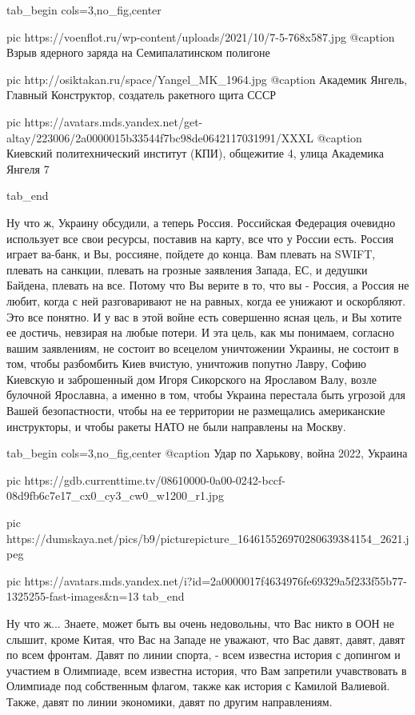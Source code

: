 \ifcmt
  tab_begin cols=3,no_fig,center

		 pic https://voenflot.ru/wp-content/uploads/2021/10/7-5-768x587.jpg
		 @caption Взрыв ядерного заряда на Семипалатинском полигоне

		 pic http://osiktakan.ru/space/Yangel_MK_1964.jpg
		 @caption Академик Янгель, Главный Конструктор, создатель ракетного щита СССР

		 pic https://avatars.mds.yandex.net/get-altay/223006/2a0000015b33544f7bc98de0642117031991/XXXL
		 @caption Киевский политехнический институт (КПИ), общежитие 4, улица Академика Янгеля 7

  tab_end
\fi

Ну что ж, Украину обсудили, а теперь Россия. Российская Федерация очевидно
использует все свои ресурсы, поставив на карту, все что у России есть. Россия
играет ва-банк, и Вы, россияне, пойдете до конца. Вам плевать на SWIFT, плевать
на санкции, плевать на грозные заявления Запада, ЕС, и дедушки Байдена, плевать
на все. Потому что Вы верите в то, что вы - Россия, а Россия не любит, когда с
ней разговаривают не на равных, когда ее унижают и оскорбляют. Это все понятно.
И у вас в этой войне есть совершенно ясная цель, и Вы хотите ее достичь,
невзирая на любые потери. И эта цель, как мы понимаем, согласно вашим
заявлениям, не состоит во всецелом уничтожении Украины, не состоит в том, чтобы
разбомбить Киев вчистую, уничтожив попутно Лавру, Софию Киевскую и заброшенный
дом Игоря Сикорского на Ярославом Валу, возле булочной Ярославна, а именно в
том, чтобы Украина перестала быть угрозой для Вашей безопастности, чтобы на ее
территории не размещались американские инструкторы, и чтобы ракеты НАТО не были
направлены на Москву.

\ifcmt
  tab_begin cols=3,no_fig,center
		 @caption Удар по Харькову, война 2022, Украина

     pic https://gdb.currenttime.tv/08610000-0a00-0242-bccf-08d9fb6c7e17_cx0_cy3_cw0_w1200_r1.jpg

		 pic https://dumskaya.net/pics/b9/picturepicture_164615526970280639384154_2621.jpeg

		 pic https://avatars.mds.yandex.net/i?id=2a0000017f4634976fe69329a5f233f55b77-1325255-fast-images&n=13
  tab_end
\fi

Ну что ж... Знаете, может быть вы очень недовольны, что Вас никто в ООН не
слышит, кроме Китая, что Вас на Западе не уважают, что Вас давят, давят, давят
по всем фронтам. Давят по линии спорта, - всем известна история с допингом и
участием в Олимпиаде, всем известна история, что Вам запретили учавствовать в
Олимпиаде под собственным флагом,  также как история с Камилой Валиевой. Также,
давят по линии экономики, давят по другим направлениям.

